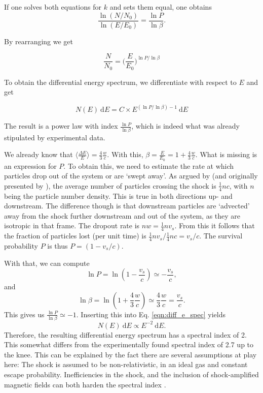 \documentclass[
    a4paper, %
    fontsize=10pt, %
    twoside=false, %
    numbers=noenddot, %
    fontmethod=tex,
]{kaobook}
\begin{document}
If one solves both equations for $k$ and sets them equal, one obtains
\begin{equation}
    \frac{\ln (N/N_0)}{\ln (E/E_0)} = \frac{\ln P}{\ln \beta}.
\end{equation}

By rearranging we get

\begin{equation}
    \frac{N}{N_0} = \bigg(\frac{E}{E_0}\bigg)^{\ln P / \ln \beta}
\end{equation}

To obtain the differential energy spectrum, we differentiate with respect to $E$ and get

\begin{equation}
\label{eqn:diff_e_spec}
    N(E)~\text{d} E = C\times E^{(\ln P/\ln\beta)-1}~\text{d} E
\end{equation}

The result is a power law with index $\frac{\ln P}{\ln \beta}$, which is indeed what was already stipulated by experimental data.

We already know that $\big\langle\frac{\Delta E}{E}\big\rangle = \frac{4}{3}\frac{w}{c}$. With this, $\beta = \frac{E}{E_0} = 1 + \frac{4}{3}\frac{w}{c}$. What is missing is an expression for $P$. To obtain this, we need to estimate the rate at which particles drop out of the system or are `swept away'. As argued by \cite{Longair2011} (and originally presented by ), the average number of particles crossing the shock is $\frac{1}{4} n c$, with $n$ being the particle number density. This is true in both directions up- and downstream. The difference though is that downstream particles are `advected' away from the shock further downstream and out of the system, as they are isotropic in that frame. The dropout rate is $n w=\frac{1}{4}nv_s$. From this it follows that the fraction of particles lost (per unit time) is $\frac{1}{4} n v_s/\frac{1}{4}nc = v_s/c$. The survival probability $P$ is thus $P=(1-v_s/c)$. 

With that, we can compute 
\begin{equation}
    \ln P = \ln ( 1-\frac{v_s}{c}) \simeq -\frac{v_s}{c},
\end{equation}
and 
\begin{equation}
   \ln \beta = \ln(1+\frac{4}{3}\frac{w}{c}) \simeq \frac{4}{3}\frac{w}{c} = \frac{v_s}{c}.
\end{equation}
This gives us $\frac{\ln P}{\ln \beta} \simeq -1$. Inserting this into Eq. \ref{eqn:diff_e_spec} yields
\begin{equation}
    N(E)~\text{d} E \propto E^{-2}~\text{d} E.
\end{equation}
Therefore, the resulting differential energy spectrum has a spectral index of 2. This somewhat differs from the experimentally found spectral index of 2.7 up to the knee. This can be explained by the fact there are several assumptions at play here: The shock is assumed to be non-relativistic, in an ideal gas and constant escape probability. Inefficiencies in the shock, and the inclusion of shock-amplified magnetic fields can both harden the spectral index \cite{Spurio2018}.
\end{document}
